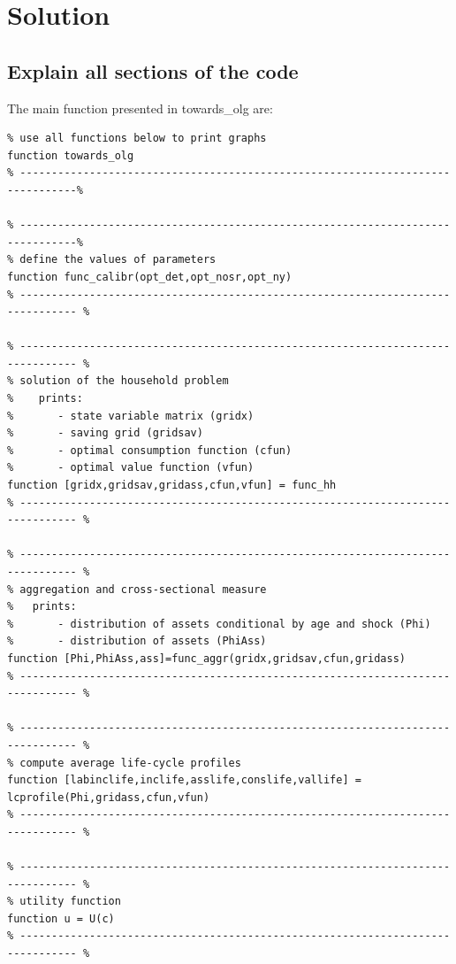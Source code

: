 \documentclass[12pt,a4paper]{article}
\begin{document}
\newpage


\section{Solution}

\subsection{Explain all sections of the code}

The main function presented in {\selectfont towards\_olg} are:

\begin{lstlisting}[frame=single]
% -------------------------------------------------------------------------------%
% use all functions below to print graphs
function towards_olg
% -------------------------------------------------------------------------------%

% -------------------------------------------------------------------------------%
% define the values of parameters
function func_calibr(opt_det,opt_nosr,opt_ny)
% ------------------------------------------------------------------------------- %

% ------------------------------------------------------------------------------- %
% solution of the household problem
%    prints:
%       - state variable matrix (gridx)
%       - saving grid (gridsav)
%       - optimal consumption function (cfun)
%       - optimal value function (vfun)
function [gridx,gridsav,gridass,cfun,vfun] = func_hh
% ------------------------------------------------------------------------------- %

% ------------------------------------------------------------------------------- %
% aggregation and cross-sectional measure
%   prints:
%       - distribution of assets conditional by age and shock (Phi)
%       - distribution of assets (PhiAss)
function [Phi,PhiAss,ass]=func_aggr(gridx,gridsav,cfun,gridass)
% ------------------------------------------------------------------------------- %

% ------------------------------------------------------------------------------- %
% compute average life-cycle profiles
function [labinclife,inclife,asslife,conslife,vallife] = lcprofile(Phi,gridass,cfun,vfun)
% ------------------------------------------------------------------------------- %

% ------------------------------------------------------------------------------- %
% utility function
function u = U(c)
% ------------------------------------------------------------------------------- %
\end{lstlisting}
\end{document}
